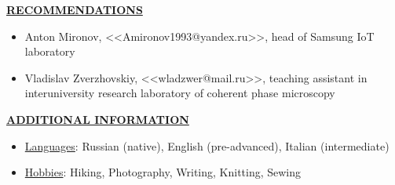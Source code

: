 \documentclass[a4paper,10pt,fullpage]{article}
\begin{document}
\begin{center}
	\underline{\textbf{RECOMMENDATIONS}}
\end{center}
\begin{itemize}
	\item Anton Mironov, <<Amironov1993@yandex.ru>>, head of Samsung IoT laboratory
	\item Vladislav Zverzhovskiy, <<wladzwer@mail.ru>>, teaching assistant in interuniversity research laboratory of coherent phase microscopy\\
\end{itemize}

\begin{center}
	\underline{\textbf{ADDITIONAL INFORMATION}}
\end{center}
\begin{itemize}
	\item \underline{Languages}: Russian (native), English (pre-advanced), Italian (intermediate)
	\item \underline{Hobbies}: Hiking, Photography, Writing, Knitting, Sewing
\end{itemize}


\end{document}
